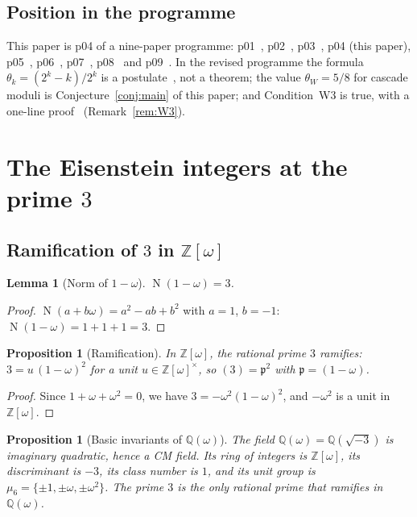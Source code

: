 \documentclass[12pt]{amsart}
\theoremstyle{plain}
\newtheorem{proposition}[theorem]{Proposition}
\newtheorem{lemma}[theorem]{Lemma}
\theoremstyle{definition}
\newcommand{\Z}{\mathbb{Z}}
\newcommand{\Q}{\mathbb{Q}}
\newcommand{\Zomega}{\Z[\omega]}
\newcommand{\Qomega}{\Q(\omega)}
\newcommand{\pp}{\mathfrak{p}}
\DeclareMathOperator{\N}{N}
\begin{document}
\subsection{Position in the programme}

This paper is p04 of a nine-paper programme: p01~\cite{WakilCF},
p02~\cite{WakilKhayyam}, p03~\cite{WakilSC}, p04 (this paper),
p05~\cite{WakilRamanujan}, p06~\cite{WakilShannon}, p07~\cite{WakilW3},
p08~\cite{WakilBias} and p09~\cite{WakilFFT}. In the revised programme the
formula $\theta_k = (2^k - k)/2^k$ is a postulate~\cite{WakilCF,WakilRamanujan},
not a theorem; the value $\theta_W = 5/8$ for cascade moduli is
Conjecture~\ref{conj:main} of this paper; and Condition~W3 is true, with a
one-line proof~\cite{WakilW3} (Remark~\ref{rem:W3}).

\section{The Eisenstein integers at the prime $3$}
\label{sec:eisenstein}

\subsection{Ramification of $3$ in $\Zomega$}

\begin{lemma}[Norm of $1-\omega$]
\label{lem:norm}
$\N(1-\omega) = 3$.
\end{lemma}

\begin{proof}
$\N(a+b\omega) = a^2 - ab + b^2$ with $a=1$, $b=-1$: $\N(1-\omega) =
1 + 1 + 1 = 3$.
\end{proof}

\begin{proposition}[Ramification]
\label{prop:ramification}
In $\Zomega$, the rational prime $3$ ramifies: $3 = u\,(1-\omega)^2$ for a
unit $u \in \Zomega^\times$, so $(3) = \pp^2$ with $\pp = (1-\omega)$.
\end{proposition}

\begin{proof}
Since $1 + \omega + \omega^2 = 0$, we have $3 = -\omega^2(1-\omega)^2$, and
$-\omega^2$ is a unit in $\Zomega$.
\end{proof}

\begin{proposition}[Basic invariants of $\Qomega$]
\label{prop:invariants}
The field $\Qomega = \Q(\sqrt{-3})$ is imaginary quadratic, hence a CM field.
Its ring of integers is $\Zomega$, its discriminant is $-3$, its class number
is $1$, and its unit group is $\mu_6 = \{\pm1, \pm\omega, \pm\omega^2\}$. The
prime $3$ is the only rational prime that ramifies in $\Qomega$.
\end{proposition}
\end{document}
